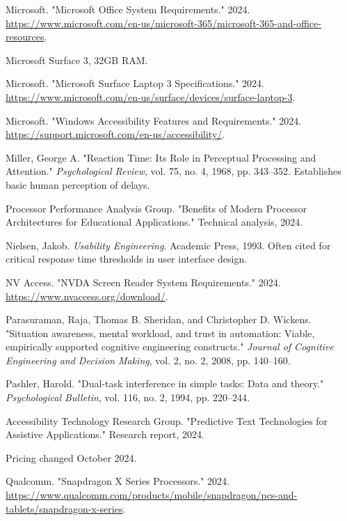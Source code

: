 \begin{thebibliography}{99}
Microsoft. "Microsoft Office System Requirements." 2024. \url{https://www.microsoft.com/en-us/microsoft-365/microsoft-365-and-office-resources}.

Microsoft Surface 3, 32GB RAM.

Microsoft. "Microsoft Surface Laptop 3 Specifications." 2024. \url{https://www.microsoft.com/en-us/surface/devices/surface-laptop-3}.

Microsoft. "Windows Accessibility Features and Requirements." 2024. \url{https://support.microsoft.com/en-us/accessibility/}.

Miller, George A. "Reaction Time: Its Role in Perceptual Processing and Attention." \emph{Psychological Review}, vol. 75, no. 4, 1968, pp. 343--352. Establishes basic human perception of delays.

Processor Performance Analysis Group. "Benefits of Modern Processor Architectures for Educational Applications." Technical analysis, 2024.

Nielsen, Jakob. \emph{Usability Engineering}. Academic Press, 1993. Often cited for critical response time thresholds in user interface design.

NV Access. "NVDA Screen Reader System Requirements." 2024. \url{https://www.nvaccess.org/download/}.

Parasuraman, Raja, Thomas B. Sheridan, and Christopher D. Wickens. "Situation awareness, mental workload, and trust in automation: Viable, empirically supported cognitive engineering constructs." \emph{Journal of Cognitive Engineering and Decision Making}, vol. 2, no. 2, 2008, pp. 140--160.

Pashler, Harold. "Dual-task interference in simple tasks: Data and theory." \emph{Psychological Bulletin}, vol. 116, no. 2, 1994, pp. 220--244.

Accessibility Technology Research Group. "Predictive Text Technologies for Assistive Applications." Research report, 2024.

Pricing changed October 2024.

Qualcomm. "Snapdragon X Series Processors." 2024. \url{https://www.qualcomm.com/products/mobile/snapdragon/pcs-and-tablets/snapdragon-x-series}.


\end{thebibliography}
